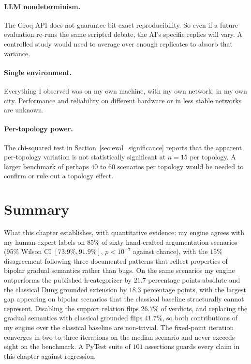 \paragraph{LLM nondeterminism.} The Groq API does not guarantee bit-exact reproducibility. So even if a future evaluation re-runs the same scripted debate, the AI's specific replies will vary. A controlled study would need to average over enough replicates to absorb that variance.

\paragraph{Single environment.} Everything I observed was on my own machine, with my own network, in my own city. Performance and reliability on different hardware or in less stable networks are unknown.

\paragraph{Per-topology power.} The chi-squared test in Section~\ref{sec:eval_significance} reports that the apparent per-topology variation is not statistically significant at $n=15$ per topology. A larger benchmark of perhaps $40$ to $60$ scenarios per topology would be needed to confirm or rule out a topology effect.




\section{Summary}
\label{sec:eval_summary}
What this chapter establishes, with quantitative evidence: my engine agrees with my human-expert labels on $85\%$ of sixty hand-crafted argumentation scenarios (95\% Wilson CI $[73.9\%, 91.9\%]$, $p < 10^{-7}$ against chance), with the $15\%$ disagreement following three documented patterns that reflect properties of bipolar gradual semantics rather than bugs. On the same scenarios my engine outperforms the published h-categorizer by $21.7$ percentage points absolute and the classical Dung grounded extension by $18.3$ percentage points, with the largest gap appearing on bipolar scenarios that the classical baseline structurally cannot represent. Disabling the support relation flips $26.7\%$ of verdicts, and replacing the gradual semantics with classical grounded flips $41.7\%$, so both contributions of my engine over the classical baseline are non-trivial. The fixed-point iteration converges in two to three iterations on the median scenario and never exceeds eight on the benchmark. A PyTest suite of $101$ assertions guards every claim in this chapter against regression.

